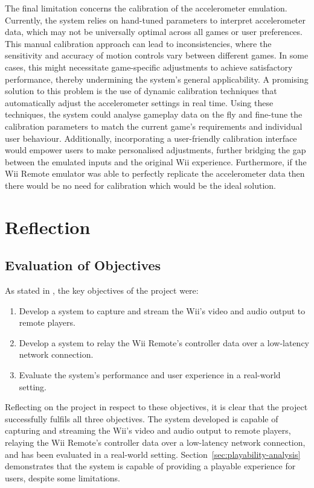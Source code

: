The final limitation concerns the calibration of the accelerometer emulation.
Currently, the system relies on hand-tuned parameters to interpret accelerometer
data, which may not be universally optimal across all games or user preferences.
This manual calibration approach can lead to inconsistencies, where the
sensitivity and accuracy of motion controls vary between different games. In
some cases, this might necessitate game-specific adjustments to achieve
satisfactory performance, thereby undermining the system’s general
applicability. A promising solution to this problem is the use of dynamic
calibration techniques that automatically adjust the accelerometer settings in
real time. Using these techniques, the system could analyse gameplay data on the
fly and fine-tune the calibration parameters to match the current game’s
requirements and individual user behaviour. Additionally, incorporating a
user-friendly calibration interface would empower users to make personalised
adjustments, further bridging the gap between the emulated inputs and the
original Wii experience. Furthermore, if the Wii Remote emulator was able to
perfectly replicate the accelerometer data then there would be no need for
calibration which would be the ideal solution.

\section{Reflection}

\subsection{Evaluation of Objectives}
As stated in , the key objectives of the project were:

\begin{enumerate}
	\item  Develop a system to capture and stream the Wii’s video and audio output to remote players.
	\item Develop a system to relay the Wii Remote’s controller data over a low-latency network connection.
	\item Evaluate the system’s performance and user experience in a real-world setting.
\end{enumerate}

Reflecting on the project in respect to these objectives, it is clear that the
project successfully fulfils all three objectives. The system developed is
capable of capturing and streaming the Wii’s video and audio output to remote
players, relaying the Wii Remote’s controller data over a low-latency network
connection, and has been evaluated in a real-world setting. Section~\ref{sec:playability-analysis} demonstrates that the system is capable of
providing a playable experience for users, despite some limitations.

